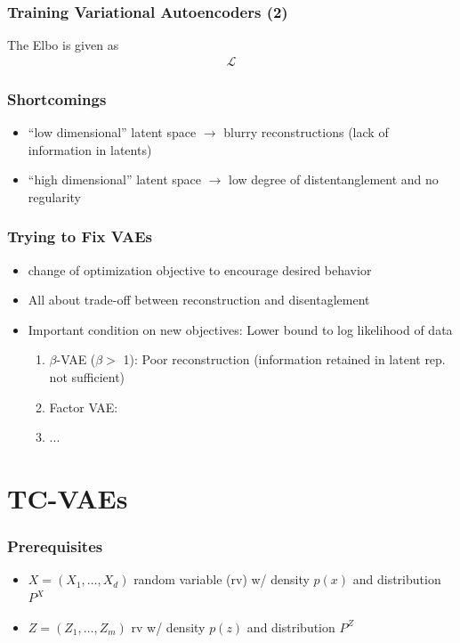 \documentclass{beamer}
\theoremstyle{definition}
\begin{document}
    \begin{frame}
      \frametitle{Training Variational Autoencoders (2)}
      The Elbo is given as
      \begin{align*}
        \mathcal{L}
      \end{align*}
    \end{frame}

    \begin{frame}
      \frametitle{Shortcomings}
      \begin{itemize}
        \item \enquote{low dimensional} latent space $\to$ blurry reconstructions (lack of information in latents)
        \item \enquote{high dimensional} latent space $\to$ low degree of distentanglement and no regularity
      \end{itemize}
    \end{frame}


    \begin{frame}
      \frametitle{Trying to Fix VAEs}
      \begin{itemize}
        \item change of optimization objective to encourage desired behavior
        \item All about trade-off between reconstruction and disentaglement
        \item Important condition on new objectives: Lower bound to log likelihood of data
        \begin{enumerate}
          \item $\beta$-VAE ($\beta > $ 1): Poor reconstruction (information retained in latent rep. not sufficient)
          \item Factor VAE:
          \item ...
        \end{enumerate}
      \end{itemize}
    \end{frame}


    \section{TC-VAEs}
    \begin{frame}
      \frametitle{Prerequisites}
      \begin{itemize}
        \item $X = (X_{1}, \dots, X_{d})$ random variable (rv) w/ density $p(x)$ and distribution $P^{X}$
        \item $Z = (Z_{1}, \dots, Z_{m})$ rv w/ density $p(z)$ and distribution $P^{Z}$
      \end{itemize}
    \end{frame}
\end{document}
